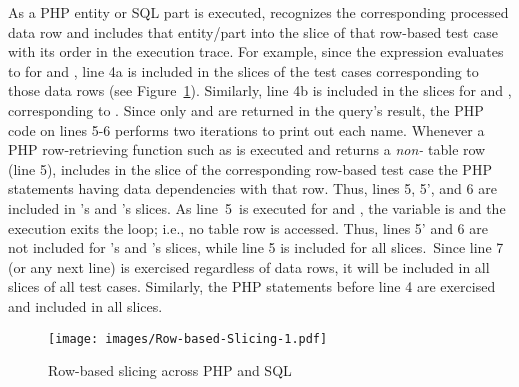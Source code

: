 As a PHP entity or SQL part is executed, \tool{} recognizes the
corresponding processed data row and includes that entity/part into
the slice of that row-based test case with its order in the execution
trace. For example, since the  expression evaluates to
 for  and , line 4a is included in
the slices of the test cases corresponding to those data rows
(see Figure~\ref{fig:Rowbased-Slicing}). Similarly, line 4b is included in
the slices for  and , corresponding to
. Since only  and 
are returned in the query's result, the PHP code on lines 5-6 performs
two iterations to print out each name. Whenever a PHP row-retrieving
function such as  is executed and returns a
\emph{non-} table row (line 5), \tool{} includes 
in the slice of the corresponding row-based test case the PHP
statements having data dependencies with that row. Thus, lines 5, 5',
and 6 are included in 's and 's slices.
As line~5~is executed for  and
, the variable  is  and the
execution exits the  loop; i.e., no table row is accessed.
Thus, lines 5' and 6 are not included for 's and
's slices, while line 5 is included for all slices.~Since 
line 7 (or any next line) is exercised regardless of
data rows, it will be included in all slices of all test cases.
Similarly, the PHP statements before line 4 are exercised and included
in all slices.


\begin{figure}[t]
  \centering
  \texttt{[image: images/Row-based-Slicing-1.pdf]}\\ %
  \caption{Row-based slicing across PHP and SQL}\label{fig:Rowbased-Slicing}
\end{figure}
